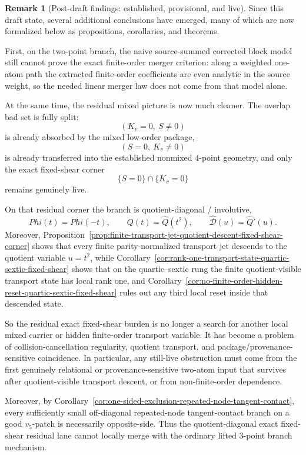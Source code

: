 \documentclass[11pt,a4paper]{amsart}
\def\Phi{Phi}%
\theoremstyle{plain}
\theoremstyle{definition}
\newtheorem{remark}[theorem]{Remark}
\begin{document}
\begin{remark}[Post-draft findings: established, provisional, and live]
\label{rem:post-draft-findings-established-provisional-live}
Since this draft state, several additional conclusions have emerged, many of
which are now formalized below as propositions, corollaries, and theorems.

First, on the two-point branch, the naive source-summed corrected block model
still cannot prove the exact finite-order merger criterion: along a weighted
one-atom path the extracted finite-order coefficients are even analytic in the
source weight, so the needed linear merger law does not come from that model
alone.

At the same time, the residual mixed picture is now much cleaner. The overlap
bad set is fully split:
\[
(K_v=0,\ S\neq 0)
\]
is already absorbed by the mixed low-order package,
\[
(S=0,\ K_v\neq 0)
\]
is already transferred into the established nonmixed $4$-point geometry,
and only the exact fixed-shear corner
\[
\{S=0\}\cap\{K_v=0\}
\]
remains genuinely live.

On that residual corner the branch is quotient-diagonal / involutive,
\[
\Phi(t)=\Phi(-t),
\qquad
Q(t)=\widehat Q(t^2),
\qquad
\widehat{\mathcal D}(u)=\widehat Q'(u).
\]
Moreover,
Proposition~\ref{prop:finite-transport-jet-quotient-descent-fixed-shear-corner}
shows that every finite parity-normalized transport jet descends to the
quotient variable $u=t^2$, while
Corollary~\ref{cor:rank-one-transport-state-quartic-sextic-fixed-shear}
shows that on the quartic--sextic rung the finite quotient-visible transport
state has local rank one, and
Corollary~\ref{cor:no-finite-order-hidden-reset-quartic-sextic-fixed-shear}
rules out any third local reset inside that descended state.

So the residual exact fixed-shear burden is no longer a search for another
local mixed carrier or hidden finite-order transport variable. It has become a
problem of collision-cancellation regularity, quotient transport, and
package/provenance-sensitive coincidence. In particular, any still-live
obstruction must come from the first genuinely relational or
provenance-sensitive two-atom input that survives after quotient-visible
transport descent, or from non-finite-order dependence.

Moreover, by
Corollary~\ref{cor:one-sided-exclusion-repeated-node-tangent-contact},
every sufficiently small off-diagonal repeated-node tangent-contact branch on a
good $v_5$-patch is necessarily opposite-side. Thus the quotient-diagonal
exact fixed-shear residual lane cannot locally merge with the ordinary lifted
$3$-point branch mechanism.


\end{remark}
\end{document}

